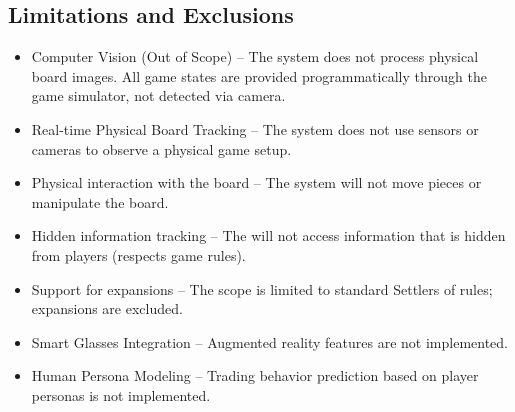 \documentclass{article}
\begin{document}
\subsection{Limitations and Exclusions}\label{subsec:limitations-and-exclusions}
\begin{itemize}
    \item {Computer Vision (Out of Scope)} – The system does not process physical board images. All game states are provided programmatically through the game simulator, not detected via camera.
    \item {Real-time Physical Board Tracking} – The system does not use sensors or cameras to observe a physical game setup.
    \item {Physical interaction with the board} – The system will not move pieces or manipulate the board.
    \item {Hidden information tracking} – The \AI{} will not access information that is hidden from players (respects game rules).
    \item {Support for expansions} – The scope is limited to standard Settlers of \emph{\Catan{}} rules; expansions are excluded.
    \item {Smart Glasses Integration} – Augmented reality features are not implemented.
    \item {Human Persona Modeling} – Trading behavior prediction based on player personas is not implemented.
\end{itemize}
\end{document}
